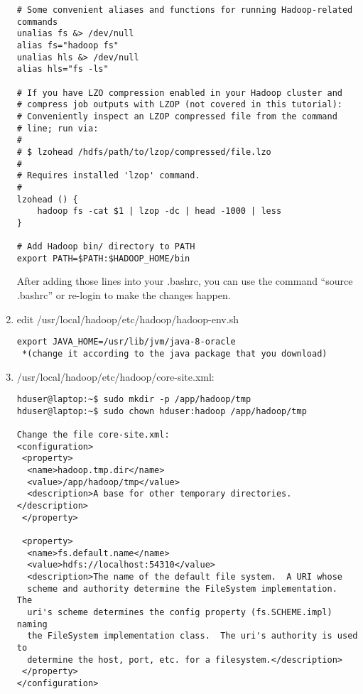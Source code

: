 \documentclass[11pt]{article}
\begin{document}
\begin{enumerate}
\begin{verbatim}
# Some convenient aliases and functions for running Hadoop-related commands
unalias fs &> /dev/null
alias fs="hadoop fs"
unalias hls &> /dev/null
alias hls="fs -ls"

# If you have LZO compression enabled in your Hadoop cluster and
# compress job outputs with LZOP (not covered in this tutorial):
# Conveniently inspect an LZOP compressed file from the command
# line; run via:
#
# $ lzohead /hdfs/path/to/lzop/compressed/file.lzo
#
# Requires installed 'lzop' command.
#
lzohead () {
    hadoop fs -cat $1 | lzop -dc | head -1000 | less
}

# Add Hadoop bin/ directory to PATH
export PATH=$PATH:$HADOOP_HOME/bin
\end{verbatim}\vspace{-.15in}
After adding those lines into your .bashrc, you can use the command ``source .bashrc'' or re-login to make the changes happen. %

\item edit /usr/local/hadoop/etc/hadoop/hadoop-env.sh
\vspace{-.15in}\begin{verbatim}
export JAVA_HOME=/usr/lib/jvm/java-8-oracle
 *(change it according to the java package that you download)
\end{verbatim}\vspace{-.15in}

\item /usr/local/hadoop/etc/hadoop/core-site.xml:
\vspace{-.15in}\begin{verbatim}
hduser@laptop:~$ sudo mkdir -p /app/hadoop/tmp
hduser@laptop:~$ sudo chown hduser:hadoop /app/hadoop/tmp

Change the file core-site.xml:
<configuration>
 <property>
  <name>hadoop.tmp.dir</name>
  <value>/app/hadoop/tmp</value>
  <description>A base for other temporary directories.</description>
 </property>

 <property>
  <name>fs.default.name</name>
  <value>hdfs://localhost:54310</value>
  <description>The name of the default file system.  A URI whose
  scheme and authority determine the FileSystem implementation.  The
  uri's scheme determines the config property (fs.SCHEME.impl) naming
  the FileSystem implementation class.  The uri's authority is used to
  determine the host, port, etc. for a filesystem.</description>
 </property>
</configuration>


\end{verbatim}
\end{enumerate}
\end{document}
